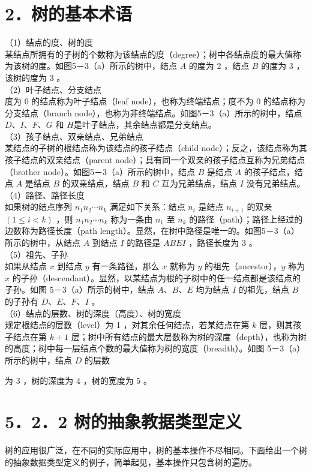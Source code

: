 \documentclass[10pt]{article}
\begin{document}
\section*{2．树的基本术语}
（1）结点的度、树的度\\
某结点所拥有的子树的个数称为该结点的度（degree）；树中各结点度的最大值称为该树的度。如图5－3（a）所示的树中，结点 $A$ 的度为 2 ，结点 $B$ 的度为 3 ，该树的度为 3 。\\
（2）叶子结点、分支结点\\
度为 0 的结点称为叶子结点（leaf node），也称为终端结点；度不为 0 的结点称为分支结点（branch node），也称为非终端结点。如图5－3（a）所示的树中，结点 $D 、 I 、 F 、 G$ 和 $H$是叶子结点，其余结点都是分支结点。\\
（3）孩子结点、双亲结点、兄弟结点\\
某结点的子树的根结点称为该结点的孩子结点（child node）；反之，该结点称为其孩子结点的双亲结点（parent node）；具有同一个双亲的孩子结点互称为兄弟结点（brother node）。如图5－3（a）所示的树中，结点 $B$ 是结点 $A$ 的孩子结点，结点 $A$ 是结点 $B$ 的双亲结点，结点 $B$ 和 $C$ 互为兄弟结点，结点 $I$ 没有兄弟结点。\\
（4）路径、路径长度\\
如果树的结点序列 $n_{1} n_{2} \cdots n_{k}$ 满足如下关系：结点 $n_{i}$ 是结点 $n_{i+1}$ 的双亲 $(1 \leqslant i<k)$ ，则 $n_{1} n_{2} \cdots n_{k}$ 称为一条由 $n_{1}$ 至 $n_{k}$ 的路径（path）；路径上经过的边数称为路径长度（path length）。显然，在树中路径是唯一的。如图5－3（a）所示的树中，从结点 $A$ 到结点 $I$ 的路径是 $A B E I$ ，路径长度为 3 。\\
（5）祖先、子孙\\
如果从结点 $x$ 到结点 $y$ 有一条路径，那么 $x$ 就称为 $y$ 的祖先（ancestor），$y$ 称为 $x$ 的子孙（descendant）。显然，以某结点为根的子树中的任一结点都是该结点的子孙。如图 5－3（a）所示的树中，结点 $A 、 B 、 E$ 均为结点 $I$ 的祖先，结点 $B$ 的子孙有 $D 、 E 、 F 、 I$ 。\\
（6）结点的层数、树的深度（高度）、树的宽度\\
规定根结点的层数（level）为 1 ，对其余任何结点，若某结点在第 $k$ 层，则其孩子结点在第 $k+1$ 层；树中所有结点的最大层数称为树的深度（depth），也称为树的高度；树中每一层结点个数的最大值称为树的宽度（breadth）。如图 5－3（a）所示的树中，结点 $D$ 的层数

为 3 ，树的深度为 4 ，树的宽度为 5 。

\section*{5．2．2 树的抽象教据类型定义}
树的应用很广泛，在不同的实际应用中，树的基本操作不尽相同。下面给出一个树的抽象数据类型定义的例子，简单起见，基本操作只包含树的遍历。
\end{document}
